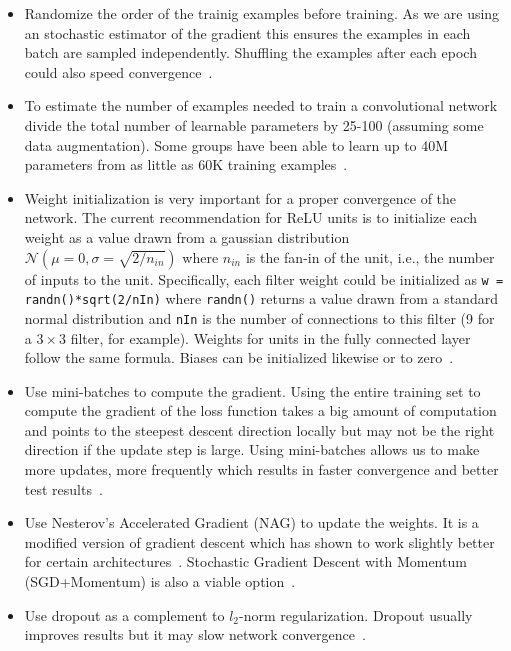 \begin{itemize}
	\item Randomize the order of the trainig examples before training. As we are using an stochastic estimator of the gradient this ensures the examples in each batch are sampled independently. Shuffling the examples after each epoch could also speed convergence~\cite{Bengio2012}.

	\item To estimate the number of examples needed to train a convolutional network divide the total number of learnable parameters by 25-100 (assuming some data augmentation). Some groups have been able to learn up to 40M parameters from as little as 60K training examples~\cite{Dieleman2015, Springenberg2014}.

	\item Weight initialization is very important for a proper convergence of the network. The current recommendation for ReLU units is to initialize each weight as a value drawn from a gaussian distribution $\mathcal{N}(\mu = 0, \sigma = \sqrt{2/n_{in}})$ where $n_{in}$ is the fan-in of the unit, i.e., the number of inputs to the unit. Specifically, each filter weight could be initialized as \texttt{w = randn()*sqrt(2/nIn)} where \texttt{randn()} returns a value drawn from a standard normal distribution and \texttt{nIn} is the number of connections to this filter (9 for a $3\times 3$ filter, for example). Weights for units in the fully connected layer follow the same formula. Biases can be initialized likewise or to zero~\cite{He2015}.

	\item Use mini-batches to compute the gradient. Using the entire training set to compute the gradient of the loss function takes a big amount of computation and points to the steepest descent direction locally but may not be the right direction if the update step is large. Using mini-batches allows us to make more updates, more frequently which results in faster convergence and better test results~\cite{Bengio2012}.

	\item Use Nesterov's Accelerated Gradient (NAG) to update the weights. It is a modified version of gradient descent which has shown to work slightly better for certain architectures~\cite{Bengio2012b}. Stochastic Gradient Descent with Momentum (SGD+Momentum) is also a viable option~\cite{Karpathy2015}.

	\item Use dropout as a complement to $l_2$-norm regularization. Dropout usually improves results but it may slow network convergence~\cite{Krizhevsky2012}.


\end{itemize}
